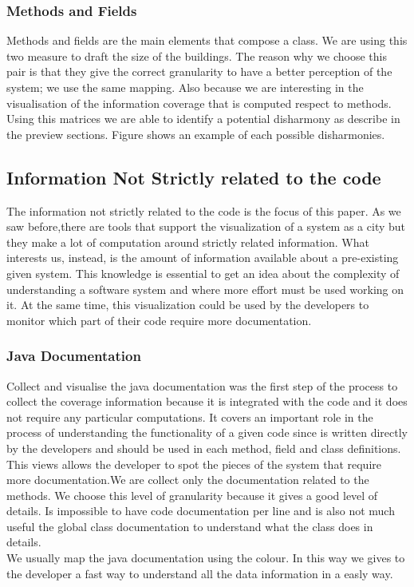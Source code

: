 \documentclass[]{usiinfbachelorproject}
\begin{document}
\subsubsection{Methods  and Fields}



Methods and fields are the main elements that compose a class. We are using this two measure to draft the size of the buildings. The reason why we choose this pair is that they give the correct granularity to have a better perception of the system; \cite{Disharmony} \cite{vssac} we use the same mapping. Also because we are interesting in the visualisation of the information coverage that is computed respect to  methods. \\
Using this matrices we are able to  identify a potential disharmony as describe in the preview sections.
Figure \label{fig:harmony} shows an example of each possible disharmonies.
 


    
\newpage
\subsection{Information Not Strictly related to the code}
The information not strictly related to the code is the focus of this paper. As we saw before,there are tools that support the visualization of a system as a city but they make a lot of computation around strictly related information. What interests us, instead, is the amount of information available about a pre-existing given system. 
This knowledge is essential to get an idea about the complexity of understanding a software system and where more effort must be used working on it. At the same time, this visualization could be used by the developers to monitor which part of their code require more documentation.


\subsubsection{Java Documentation}
Collect and visualise the java documentation was the first step of the process to collect the coverage information because it is integrated with the code and it does not require any particular computations. It covers an important role in the process of understanding the functionality of a given code since is written directly by the developers and should be used in each method, field and class definitions.\\
This views allows the developer to spot the pieces of the system that require more documentation.We are collect only the documentation related to the methods. We choose this level of granularity because it gives a good level of details. Is impossible to have code documentation per line and is also not much useful the global class documentation to understand what the class does in details. \\
We usually map the java documentation using the colour. In this way we gives to the developer a fast way to understand all the data information in a easly way. 
\end{document}
